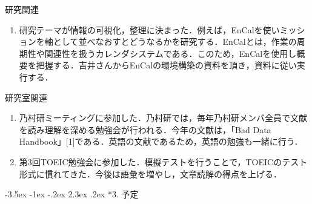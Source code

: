 \documentclass[fleqn, 14pt]{extarticlej}
\makeatletter
\renewcommand\labelenumi{(\theenumi)}
\def\section{\@startsection {section}{1}{\z@}%
{-3.5ex \@plus -1ex \@minus -.2ex}%
{2.3ex \@plus.2ex}%
{\sectionformat}}
\def\sectionformat{\normalsize}
\makeatother
\begin{document}
\begin{description}
  \itemsep -1mm

\item[　2.1] 研究関連
  \vspace{-0.8em}
  \begin{enumerate}
    \renewcommand{\labelenumi}{(1)}
  \item 研究テーマが情報の可視化，整理に決まった．例えば，EnCalを使いミッションを軸として並べなおすとどうなるかを研究する．EnCalとは，作業の周期性や関連性を扱うカレンダシステムである．このため，EnCalを使用し概要を把握する．吉井さんからEnCalの環境構築の資料を頂き，資料に従い実行する．
  
  
  \end{enumerate}

  \vspace{-0.5em}
  \item[　2.2] 研究室関連
    \vspace{-1.0em}
    \begin{enumerate}
      \renewcommand{\labelenumi}{(2)}
    \item 
乃村研ミーティングに参加した．乃村研では，毎年乃村研メンバ全員で文献を読み理解を深める勉強会が行われる．今年の文献は，「Bad Data Handbook」[1]である．英語の文献であるため，英語の勉強も一緒に行う．
      \renewcommand{\labelenumi}{(5)}
    \item 第3回TOEIC勉強会に参加した．模擬テストを行うことで，TOEICのテスト形式に慣れてきた．今後は語彙を増やし，文章読解の得点を上げる．
    
    \end{enumerate}

\end{description}

\vspace{-1.5em}
\section*{3. 予定}
\vspace{-0.8em}
\end{document}

